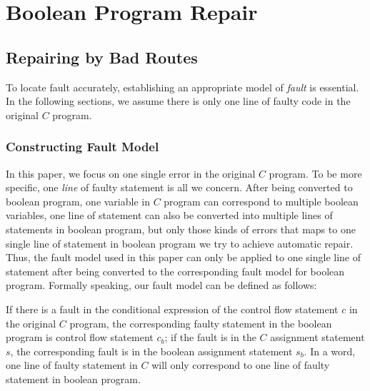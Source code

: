 \section{Boolean Program Repair}
\label{section:BooleanProgramRepair}
\subsection{Repairing by Bad Routes}
To locate fault accurately, establishing an appropriate model of {\it fault} is essential. In the following sections, we assume there is only one line of faulty code in the original $C$ program.
\subsubsection{Constructing Fault Model}
In this paper, we focus on one single error in the original $C$ program. To be more specific, one {\it line} of faulty statement is all we concern.
After being converted to boolean program, one variable in $C$ program can correspond to multiple boolean variables, one line of statement can also be converted into multiple lines of statements in boolean program,
but only those kinds of errors that maps to one single line of statement in boolean program we try to achieve automatic repair.
Thus, the fault model used in this paper can only be applied to one single line of statement after being converted to the corresponding fault model for boolean program.
Formally speaking, our fault model can be defined as follows:
\begin{definition}
If there is a fault in the conditional expression of the control flow statement $c$ in the original $C$ program, the corresponding faulty statement in the boolean program is control flow statement $c_{b}$;
if the fault is in the $C$ assignment statement $s$, the corresponding fault is in the boolean assignment statement $s_{b}$.
In a word, one line of faulty statement in $C$ will only correspond to one line of faulty statement in boolean program.
\end{definition}

